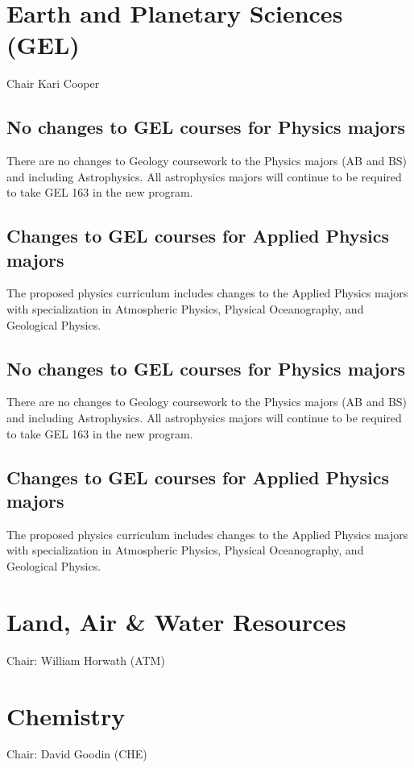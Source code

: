 \documentclass[12pt]{article}
\begin{document}
\newpage
\section{Earth and Planetary Sciences (GEL)}
Chair Kari Cooper


\subsection{No changes to GEL courses for Physics majors}


There are no changes to Geology coursework to the Physics majors (AB
and BS) and including Astrophysics.  All astrophysics majors will
continue to be required to take GEL 163 in the new program.

\subsection{Changes to GEL courses for Applied Physics majors}

The proposed physics curriculum includes changes to the Applied
Physics majors with specialization in Atmospheric Physics, Physical
Oceanography, and Geological Physics.

\subsection{No changes to GEL courses for Physics majors}

There are no changes to Geology coursework to the Physics majors (AB
and BS) and including Astrophysics.  All astrophysics majors will
continue to be required to take GEL 163 in the new program.

\subsection{Changes to GEL courses for Applied Physics majors}

The proposed physics curriculum includes changes to the Applied
Physics majors with specialization in Atmospheric Physics, Physical
Oceanography, and Geological Physics.





\section{Land, Air \& Water Resources}
Chair: William Horwath (ATM)

\section{Chemistry}
Chair: David Goodin (CHE)
\end{document}
